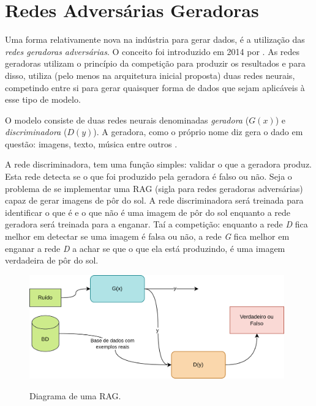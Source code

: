 \section{Redes Adversárias Geradoras}
\label{sec:gan}

Uma forma relativamente nova na indústria para gerar dados, é a utilização das \textit{redes geradoras adversárias}. O conceito foi introduzido em 2014 por . As redes geradoras utilizam o princípio da competição para produzir os resultados e para disso, utiliza (pelo menos na arquitetura inicial proposta) duas redes neurais, competindo entre si para gerar quaisquer forma de dados que sejam aplicáveis à esse tipo de modelo.

O modelo consiste de duas redes neurais denominadas \textit{geradora} ($G(x)$) e \textit{discriminadora} ($D(y)$). A geradora, como o próprio nome diz gera o dado em questão: imagens, texto, música entre outros \cite{c_han_gan-based_2018, xu_diversity-promoting_2018, oza_progressive_2019}. 

A rede discriminadora, tem uma função simples: validar o que a geradora produz. Esta rede detecta se o que foi produzido pela geradora é falso ou não. Seja o problema de se implementar uma RAG (sigla para redes geradoras adversárias) capaz de gerar imagens de pôr do sol. A rede discriminadora será treinada para identificar o que é e o que não é uma imagem de pôr do sol enquanto a rede geradora será treinada para a enganar. Taí a competição: enquanto a rede \textit{D} fica melhor em detectar se uma imagem é falsa ou não, a rede \textit{G} fica melhor em enganar a rede \textit{D} a achar se que o que ela está produzindo, é uma imagem verdadeira de pôr do sol.

\begin{figure}[H]
    \centering
    \caption{Diagrama de uma RAG.}
    \includegraphics[width=11cm]{fig/GAN_2.png}
    \label{fig:fig7}
\end{figure}

